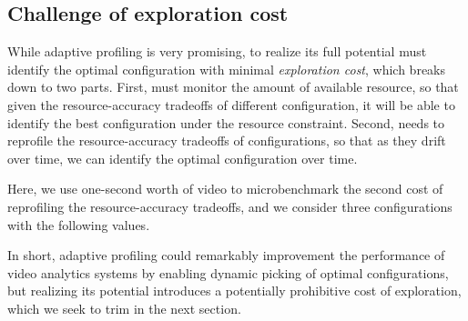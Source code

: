 \begin{figure}[t!]
{        \label{fig:eval-overall-quality-jointime}
}
\hspace{-0.4cm}
\hspace{-0.4cm}
\vspace{-0.2cm}
\label{fig:eval-overall-quality}
\end{figure}

\subsection{Challenge of exploration cost}
While adaptive profiling is very promising, to realize its full 
potential \name must identify the optimal configuration with minimal
{\em exploration cost}, which breaks down to two parts.
First, \name must monitor the amount of available resource, so that
given the resource-accuracy tradeoffs of different configuration, 
it will be able to identify the best configuration under the resource
constraint. 
Second, \name needs to reprofile the resource-accuracy tradeoffs of 
configurations, so that as they drift over time, we can identify the
optimal configuration over time.

Here, we use one-second worth of video to microbenchmark the second 
cost of reprofiling the resource-accuracy tradeoffs, and we consider
three configurations with the following values.

In short, adaptive profiling could remarkably improvement the 
performance of video analytics systems by enabling dynamic picking
of optimal configurations, but realizing its potential introduces
a potentially prohibitive cost of exploration, which we seek to 
trim in the next section.
